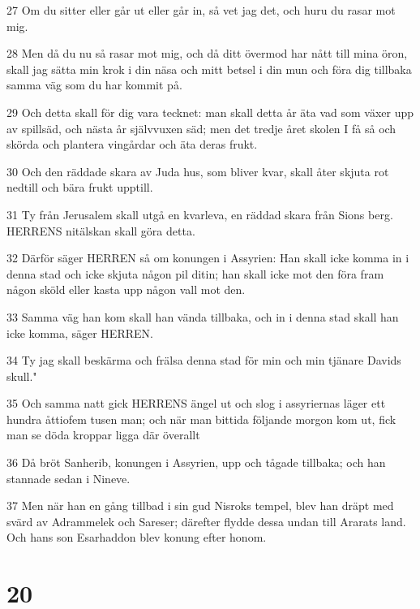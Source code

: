 \par 27 Om du sitter eller går ut eller går in, så vet jag det, och huru du rasar mot mig.
\par 28 Men då du nu så rasar mot mig, och då ditt övermod har nått till mina öron, skall jag sätta min krok i din näsa och mitt betsel i din mun och föra dig tillbaka samma väg som du har kommit på.
\par 29 Och detta skall för dig vara tecknet: man skall detta år äta vad som växer upp av spillsäd, och nästa år självvuxen säd; men det tredje året skolen I få så och skörda och plantera vingårdar och äta deras frukt.
\par 30 Och den räddade skara av Juda hus, som bliver kvar, skall åter skjuta rot nedtill och bära frukt upptill.
\par 31 Ty från Jerusalem skall utgå en kvarleva, en räddad skara från Sions berg. HERRENS nitälskan skall göra detta.
\par 32 Därför säger HERREN så om konungen i Assyrien: Han skall icke komma in i denna stad och icke skjuta någon pil ditin; han skall icke mot den föra fram någon sköld eller kasta upp någon vall mot den.
\par 33 Samma väg han kom skall han vända tillbaka, och in i denna stad skall han icke komma, säger HERREN.
\par 34 Ty jag skall beskärma och frälsa denna stad för min och min tjänare Davids skull."
\par 35 Och samma natt gick HERRENS ängel ut och slog i assyriernas läger ett hundra åttiofem tusen man; och när man bittida följande morgon kom ut, fick man se döda kroppar ligga där överallt
\par 36 Då bröt Sanherib, konungen i Assyrien, upp och tågade tillbaka; och han stannade sedan i Nineve.
\par 37 Men när han en gång tillbad i sin gud Nisroks tempel, blev han dräpt med svärd av Adrammelek och Sareser; därefter flydde dessa undan till Ararats land. Och hans son Esarhaddon blev konung efter honom.

\chapter{20}

